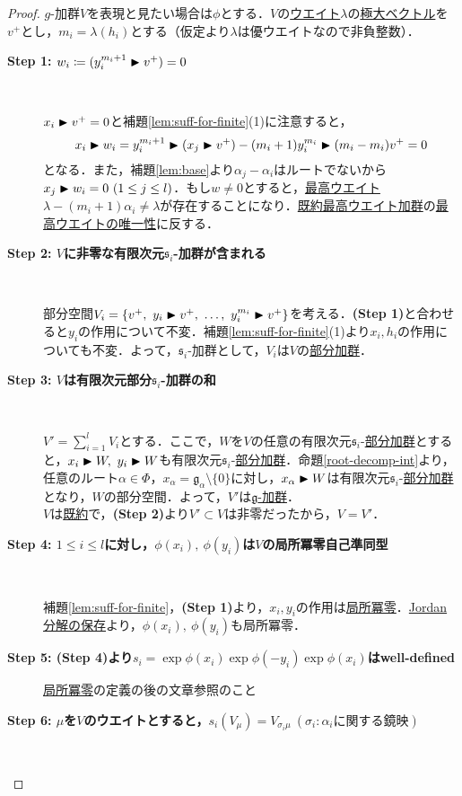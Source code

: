 \documentclass[rep_main]{subfiles}
\begin{document}
\begin{proof}
	$g$-加群$V$を表現と見たい場合は$\phi$とする．$V$の\hyperref[def:weight-rep]{ウエイト}$\lambda$の\hyperref[def:maximal-vector-rep]{極大ベクトル}を$v^+$とし，$m_i = \lambda(h_i)$とする（仮定より$\lambda$は優ウエイトなので非負整数）．
	\begin{description}
		\item[\textbf{Step 1: $w_i \coloneqq (y_i^{m_i + 1} \blacktriangleright v^+) = 0$}]　
		
		$x_i \blacktriangleright v^+ = 0$と補題\ref{lem:suff-for-finite}(1)に注意すると，
		\begin{equation}
			x_i \blacktriangleright w_i = y_i^{m_i + 1} \blacktriangleright (x_j \blacktriangleright v^+) - (m_i + 1)y_i^{m_i} \blacktriangleright (m_i - m_i)v^+ = 0
		\end{equation}
		となる．また，補題\ref{lem:base}より$\alpha_j - \alpha_i$はルートでないから$x_j \blacktriangleright w_i = 0\ (1 \leq j \leq l)$．もし$w \neq 0$とすると，\hyperref[def:highest-weight-module]{最高ウエイト}$\lambda - (m_i + 1)\alpha_i \neq \lambda$が存在することになり．\hyperref[thm:hwmodule-exist]{既約最高ウエイト加群}の\hyperref[col:highest-weight-uni]{最高ウエイトの唯一性}に反する．
		\item[\textbf{Step 2: $V$に非零な有限次元$\mathfrak{s}_i$-加群が含まれる}] 　
		
		部分空間$V_i = \{v^+,\ y_i \btr v^+,\ \ldots,\ y_i^{m_i}\btr v^+ \}$を考える．\textbf{(Step 1)}と合わせると$y_i$の作用について不変．補題\ref{lem:suff-for-finite}(1)より$x_i, h_i$の作用についても不変．よって，$\mathfrak{s}_i$-加群として，$V_i$は$V$の\hyperref[def:sub-g-module]{部分加群}．
		\item[\textbf{Step 3: $V$は有限次元部分$\mathfrak{s}_i$-加群の和}] 　
		
		$V' = \sum_{i = 1}^l V_i$とする．ここで，$W$を$V$の任意の有限次元$\mathfrak{s}_i$-\hyperref[def:sub-g-module]{部分加群}とすると，$x_i \blacktriangleright W,\ y_i \blacktriangleright W$も有限次元$\mathfrak{s}_i$-\hyperref[def:sub-g-module]{部分加群}．命題\ref{root-decomp-int}より，任意のルート$\alpha \in \Phi$，$x_\alpha = \mathfrak{g}_\alpha \setminus \{0\}$に対し，$x_\alpha \blacktriangleright W$は有限次元$\mathfrak{s}_i$-\hyperref[def:sub-g-module]{部分加群}となり，$W$の部分空間．よって，$V'$は\hyperref[ax:g-module]{$\mathfrak{g}$-加群}．\\
		$V$は\hyperref[def:irr]{既約}で，\textbf{(Step 2)}より$V' \subset V$は非零だったから，$V = V'$．
		\item[\textbf{Step 4: $1 \leq i \leq l$に対し，$\phi(x_i),\ \phi(y_i)$は$V$の局所冪零自己準同型}]　
		
		補題\ref{lem:suff-for-finite}，\textbf{(Step 1)}より，$x_i, y_i$の作用は\hyperref[def:locally-nilpotent]{局所冪零}．\hyperref[col:JC]{Jordan分解の保存}より，$\phi(x_i),\ \phi(y_i)$も局所冪零．
		\item[\textbf{Step 5: (Step 4)より$s_i = \exp\phi(x_i)\exp\phi(-y_i)\exp\phi(x_i)$はwell-defined}] \hyperref[def:locally-nilpotent]{局所冪零}の定義の後の文章参照のこと
		\item[\textbf{Step 6: $\mu$を$V$のウエイトとすると，$s_i(V_\mu) = V_{\sigma_i\mu}\ (\sigma_i: \alpha_i\text{に関する鏡映})$}]　
		

\end{description}
\end{proof}
\end{document}
